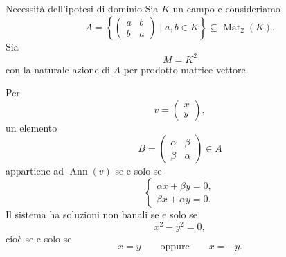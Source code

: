 \documentclass[a4paper]{article}
\begin{document}
\begin{radioactive}
\begin{snippetexample}{Necessità dell'ipotesi di dominio}
    Sia \(K\) un campo e consideriamo
    \[
        A=
        \left\{
            \begin{pmatrix}
                a & b\\
                b & a
            \end{pmatrix}
            \mid
            a,b\in K
        \right\}
        \subseteq
        \operatorname{Mat}_2(K).
    \]
    Sia
    \[
        M=K^2
    \]
    con la naturale azione di \(A\) per prodotto matrice-vettore.

    Per
    \[
        v=
        \begin{pmatrix}
            x\\
            y
        \end{pmatrix},
    \]
    un elemento
    \[
        B=
        \begin{pmatrix}
            \alpha & \beta\\
            \beta & \alpha
        \end{pmatrix}
        \in A
    \]
    appartiene ad \(\operatorname{Ann}(v)\) se e solo se
    \[
        \begin{cases}
            \alpha x+\beta y=0,\\
            \beta x+\alpha y=0.
        \end{cases}
    \]
    Il sistema ha soluzioni non banali se e solo se
    \[
        x^2-y^2=0,
    \]
    cioè se e solo se
    \[
        x=y
        \qquad
        \text{oppure}
        \qquad
        x=-y.
    \]


\end{snippetexample}
\end{radioactive}
\end{document}
